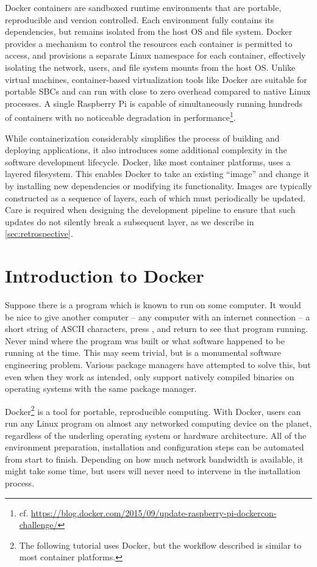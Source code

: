\documentclass[12pt,initial,twoside,maitrise]{dms}
\numberwithin{equation}{section}
\numberwithin{table}{chapter}
\numberwithin{figure}{chapter}
\begin{document}
Docker containers are sandboxed runtime environments that are portable, reproducible and version controlled. Each environment fully contains its dependencies, but remains isolated from the host OS and file system. Docker provides a mechanism to control the resources each container is permitted to access, and provisions a separate Linux namespace for each container, effectively isolating the network, users, and file system mounts from the host OS. Unlike virtual machines, container-based virtualization tools like Docker are suitable for portable SBCs and can run with close to zero overhead compared to native Linux processes. A single Raspberry Pi is capable of simultaneously running hundreds of containers with no noticeable degradation in performance\footnote{cf. \url{https://blog.docker.com/2015/09/update-raspberry-pi-dockercon-challenge/}}.

While containerization considerably simplifies the process of building and deploying applications, it also introduces some additional complexity in the software development lifecycle. Docker, like most container platforms, uses a layered filesystem. This enables Docker to take an existing ``image'' and change it by installing new dependencies or modifying its functionality. Images are typically constructed as a sequence of layers, each of which must periodically be updated. Care is required when designing the development pipeline to ensure that such updates do not silently break a subsequent layer, as we describe in \autoref{sec:retrospective}.

\section{Introduction to Docker}\label{sec:docker-intro}

Suppose there is a program which is known to run on some computer. It would be nice to give another computer -- any computer with an internet connection -- a short string of ASCII characters, press \keys{\return}, and return to see that program running. Never mind where the program was built or what software happened to be running at the time. This may seem trivial, but is a monumental software engineering problem. Various package managers have attempted to solve this, but even when they work as intended, only support natively compiled binaries on operating systems with the same package manager.

Docker\footnote{The following tutorial uses Docker, but the workflow described is similar to most container platforms.} is a tool for portable, reproducible computing. With Docker, users can run any Linux program on almost any networked computing device on the planet, regardless of the underling operating system or hardware architecture. All of the environment preparation, installation and configuration steps can be automated from start to finish. Depending on how much network bandwidth is available, it might take some time, but users will never need to intervene in the installation process.
\end{document}
